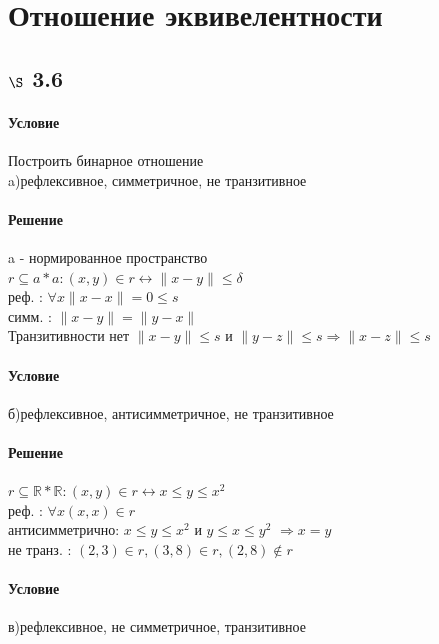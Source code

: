\documentclass[a4paper,12pt]{article}
\begin{document}
\section{Отношение эквивелентности}
\subsection*{$\S$ 3.6}
\paragraph*{Условие}
Построить бинарное отношение\\
a)рефлексивное, симметричное, не транзитивное\\
\paragraph*{Решение}
a - нормированное пространство\\
$ r \subseteq a \ast a : (x,y) \in r \leftrightarrow \parallel x - y \parallel \leq \delta $\\
реф. : $\forall x \parallel x - x \parallel = 0 \leq s $\\
симм. : $\parallel x - y \parallel = \parallel y -x  \parallel $\\
Транзитивности нет $\parallel x - y \parallel \leq s $ и $ \parallel y - z  \parallel \leq s \Rightarrow \parallel x - z \parallel \leq s $\\
\paragraph*{Условие}
б)рефлексивное, антисимметричное, не транзитивное\\
\paragraph*{Решение}
$ r \subseteq \mathbb{R} \ast \mathbb{R} : (x,y) \in r \leftrightarrow x \leq y \leq x^2 $\\
реф. : $\forall x (x,x) \in r$\\
антисимметрично: $ x \leq y \leq x^2 $ и $ y \leq x \leq y^2 $ $\Rightarrow x=y$\\
не транз. : $ (2,3) \in r, (3,8) \in r , (2,8) \not\in r$\\
\paragraph*{Условие}
в)рефлексивное, не симметричное, транзитивное\\
\end{document}

